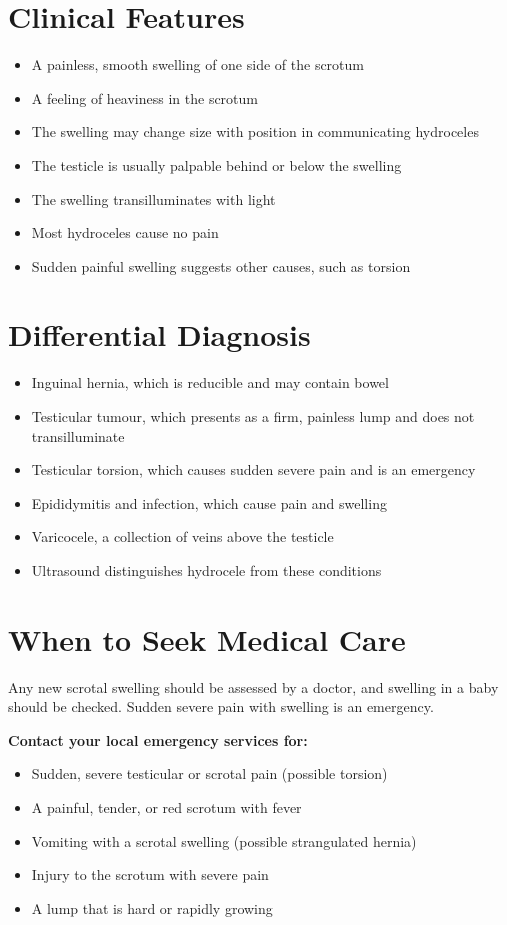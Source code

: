 \section*{Clinical Features}
\begin{itemize}
    \item A painless, smooth swelling of one side of the scrotum
    \item A feeling of heaviness in the scrotum
    \item The swelling may change size with position in communicating hydroceles
    \item The testicle is usually palpable behind or below the swelling
    \item The swelling transilluminates with light
    \item Most hydroceles cause no pain
    \item Sudden painful swelling suggests other causes, such as torsion
\end{itemize}

\section*{Differential Diagnosis}
\begin{itemize}
    \item Inguinal hernia, which is reducible and may contain bowel
    \item Testicular tumour, which presents as a firm, painless lump and does not transilluminate
    \item Testicular torsion, which causes sudden severe pain and is an emergency
    \item Epididymitis and infection, which cause pain and swelling
    \item Varicocele, a collection of veins above the testicle
    \item Ultrasound distinguishes hydrocele from these conditions
\end{itemize}

\section*{When to Seek Medical Care}
Any new scrotal swelling should be assessed by a doctor, and swelling in a baby should be checked. Sudden severe pain with swelling is an emergency.

\textbf{Contact your local emergency services for:}
\begin{itemize}
    \item Sudden, severe testicular or scrotal pain (possible torsion)
    \item A painful, tender, or red scrotum with fever
    \item Vomiting with a scrotal swelling (possible strangulated hernia)
    \item Injury to the scrotum with severe pain
    \item A lump that is hard or rapidly growing
\end{itemize}

